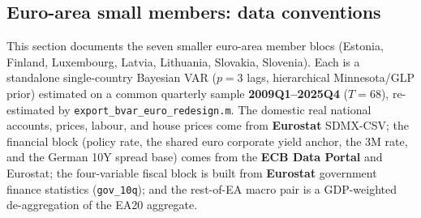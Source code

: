 
\subsection{Euro-area small members: data conventions}\label{sec:data:euro-small}

This section documents the seven smaller euro-area member blocs
(Estonia, Finland, Luxembourg, Latvia, Lithuania, Slovakia, Slovenia).
Each is a standalone single-country Bayesian VAR ($p=3$ lags,
hierarchical Minnesota/GLP prior) estimated on a common quarterly sample
\textbf{2009Q1--2025Q4} ($T=68$), re-estimated by
\texttt{export\_bvar\_euro\_redesign.m}.  The domestic real national
accounts, prices, labour, and house prices come from \textbf{Eurostat}
SDMX-CSV; the financial block (policy rate, the shared euro corporate
yield anchor, the 3M rate, and the German 10Y spread base) comes from the
\textbf{ECB Data Portal} and Eurostat; the four-variable fiscal block is
built from \textbf{Eurostat} government finance statistics
(\texttt{gov\_10q}); and the rest-of-EA macro pair is a GDP-weighted
de-aggregation of the EA20 aggregate.

